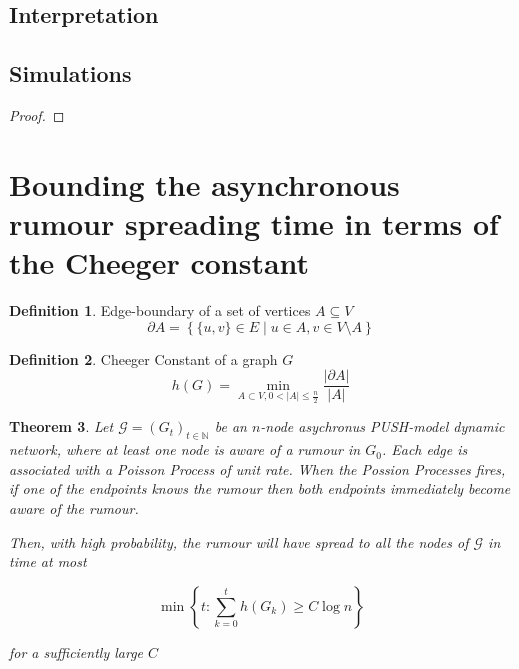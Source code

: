 \documentclass[a4paper,11pt]{article}
\newtheorem{theorem}{Theorem}[section]
\theoremstyle{definition}
\newtheorem{definition}[theorem]{Definition}
\begin{document}
\subsection{Interpretation}


\subsection{Simulations}



\begin{proof}
	
\end{proof}

\section{Bounding the asynchronous rumour spreading time in terms of the Cheeger constant}

\begin{definition}
	Edge-boundary of a set of vertices $A \subseteq V$
	$$
		\partial A = \left\{ \{u, v\} \in E \mid u \in A, v \in V \setminus A \right\} 
	$$
\end{definition}

\begin{definition}
	Cheeger Constant of a graph $G$
	$$
		h(G) = \min_{A \subset V, 0 < |A| \leq \frac{n}{2}} \frac{|\partial A|}{|A|}
	$$

\end{definition}

\begin{theorem}
	Let $\mathcal{G} = (G_t)_{t \in \mathbb{N}}$ be an $n$-node asychronus PUSH-model dynamic network, where at least one node is aware of a rumour in $G_0$. Each edge is associated with a Poisson Process of unit rate. When the Possion Processes fires, if one of the endpoints knows the rumour then both endpoints immediately become aware of the rumour. %

	Then, with high probability, the rumour will have spread to all the nodes of $\mathcal{G}$ in time at most

	$$
		\min \left\{t : \sum_{k=0}^t h(G_k) \geq C \log n \right\} 
	$$

	\noindent
	for a sufficiently large $C$
\end{theorem}
\end{document}
